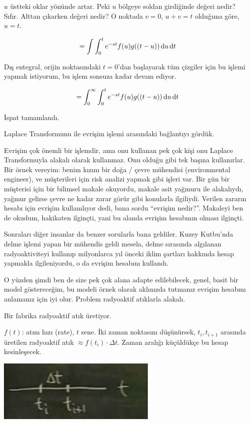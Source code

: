 \documentclass[12pt,fleqn]{article}\usepackage{../../common}
\begin{document}
$u$ üstteki oklar yönünde artar. Peki $u$ bölgeye soldan girdiğinde değeri
nedir? Sıfır. Alttan çıkarken değeri nedir? O noktada $v=0$, $u+v = t$ olduğuna
göre, $u=t$.

$$ = \int \int_0^t e^{-st} f(u)g((t-u)) \,\mathrm{d} u \,\mathrm{d} t $$

Dış entegral, orijin noktasındaki $t=0$'dan başlayarak tüm çizgiler için bu
işlemi yapmak istiyorum, bu işlem sonsuza kadar devam ediyor. 

$$ = \int_0^{\infty} \int_0^t e^{-st} f(u)g((t-u)) \,\mathrm{d} u \,\mathrm{d} t $$

İspat tamamlandı. 

Laplace Transformunu ile evrişim işlemi arasındaki bağlantıyı gördük. 

Evrişim çok önemli bir işlemdir, ama onu kullanan pek çok kişi onu Laplace
Transformuyla alakalı olarak kullanmaz. Onu olduğu gibi tek başına
kullanırlar. Bir örnek vereyim: benim kızım bir doğa / çevre mühendisi
(environmental engineer), ve müşterileri için risk analizi yapmak gibi işleri
var. Bir gün bir müşterisi için bir bilimsel makale okuyordu, makale asit
yağmuru ile alakalıydı, yağmur gelirse çevre ne kadar zarar görür gibi konularla
ilgiliydi. Verilen zararın hesabı için evrişim kullanılıyor dedi, bana sordu
``evrişim nedir?''. Makaleyi ben de okudum, hakikaten ilginçti, yani bu alanda
evrişim hesabının olması ilginçti.

Sonraları diğer insanlar da benzer sorularla bana geldiler. Kuzey Kutbu'nda
delme işlemi yapan bir mühendis geldi mesela, delme sırasında algılanan
radyoaktiviteyi kullanıp milyonlarca yıl önceki iklim şartları hakkında hesap
yapmakla ilgileniyordu, o da evrişim hesabını kullandı.

O yüzden şimdi ben de size pek çok alana adapte edilebilecek, genel, basit bir
model göstereceğim, bu modeli örnek olarak aklınızda tutmanız evrişim hesabını
anlamanız için iyi olur. Problem radyoaktif atıklarla alakalı.

Bir fabrika radyoaktif atık üretiyor. 

$f(t)$: atım hızı (rate), $t$ sene. İki zaman noktasını düşünürsek,
$t_i,t_{i+1}$ arasında üretilen radyoaktif atık $\approx f(t_i) \cdot \Delta
t$. Zaman aralığı küçüldükçe bu hesap kesinleşecek.

\includegraphics[height=3cm]{21_3.png}
\end{document}
